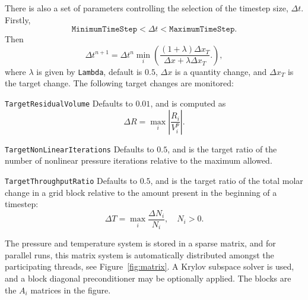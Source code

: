 

There is also a set of parameters controlling the selection of the
timestep size, $\Delta t$. Firstly,
\begin{equation}
  \texttt{MinimumTimeStep} < \Delta t < \texttt{MaximumTimeStep}.
\end{equation}
Then
\begin{equation}
  \Delta t^{n+1} = \Delta t^n \min_i \left(
    \frac{(1+\lambda) \Delta x_T}{\Delta x + \lambda \Delta x_T}.
  \right),
\end{equation}
where $\lambda$ is given by \texttt{Lambda}, default is $0.5$, $\Delta
x$ is a quantity change, and $\Delta x_T$ is the target change. The
following target changes are monitored:
\begin{list}{}{}
\item[\texttt{TargetResidualVolume}] Defaults to $0.01$, and is
  computed as
  \begin{equation}
    \Delta R = \max_i \left|\frac{R_i}{V_i^p}\right|.
  \end{equation}
\item[\texttt{TargetNonLinearIterations}] Defaults to $0.5$, and is
  the target ratio of the number of nonlinear pressure iterations
  relative to the maximum allowed.
\item[\texttt{TargetThroughputRatio}] Defaults to $0.5$, and is
  the target ratio of the total molar change in a grid block relative
  to the amount present in the beginning of a timestep:
  \begin{equation*}
    \Delta T = \max_i \frac{\Delta N_i}{N_i},\quad N_i>0.
  \end{equation*}
\end{list}



The pressure and temperature system is stored in a sparse matrix, and
for parallel runs, this matrix system is automatically distributed
amongst the participating threads, see Figure~\ref{fig:matrix}. A
Krylov subspace solver is used, and a block diagonal preconditioner
may be optionally applied. The blocks are the $A_i$ matrices in the
figure.

